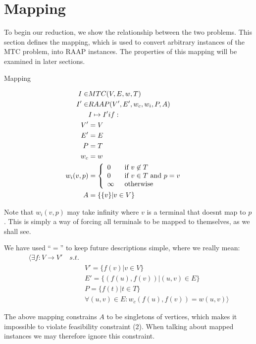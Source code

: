 \section{Mapping}

To begin our reduction, we show the relationship between the two problems.
This section defines the mapping, which is used to convert arbitrary instances of the MTC problem, into RAAP instances.
The properties of this mapping will be examined in later sections.

\begin{definition}
Mapping

\begin{align}
	\nonumber I \in & MTC(V,E,w,T) &\\
	\nonumber I' \in & RAAP(V', E', w_c, w_i, P, A) &\\
	\nonumber & I \mapsto I' if: &\\
	\nonumber V' & = V\\
	\nonumber E' & = E\\
	\nonumber P & = T\\
	\nonumber w_c & = w\\
	\nonumber w_i(v,p) & = \mbox{$\left\{ 
		\begin{array}{l l}
			0 \quad & \mbox{if $v \not\in T$}\\
			0 & \mbox{if $v \in T$ and $p = v$}\\
			\infty & \mbox{otherwise}\\ \end{array} \right.$} \\
	\nonumber A & = \{\{v\} | v \in V\}
\end{align}

Note that $w_i(v, p)$ may take infinity where $v$ is a terminal that doesnt map to $p$.
This is simply a way of forcing all terminals to be mapped to themselves, as we shall see.

We have used ``$=$'' to keep future descriptions simple, where we really mean:
\begin{align}
	\nonumber \langle \exists f : V \rightarrow V' \quad s.t. & \\
	\nonumber & V' = \{f(v) | v \in V\} \\
	\nonumber & E' = \{(f(u), f(v)) | (u,v) \in E\} \\
	\nonumber & P = \{f(t) | t \in T\} \\
	\nonumber & \forall (u, v) \in E : w_c(f(u), f(v)) = w(u, v) \rangle
\end{align}

The above mapping constrains $A$ to be singletons of vertices, which makes it impossible to violate feasibility constraint (2).
When talking about mapped instances we may therefore ignore this constraint.
\end{definition}

